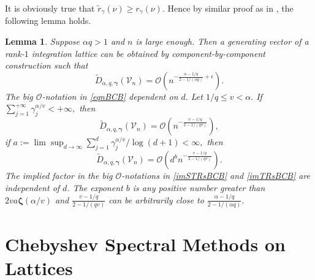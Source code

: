 \documentclass[article]{siamltex}
\newtheorem{Lemma}{Lemma}
\def\bgam{{\boldsymbol \gamma }}
\def\bzeta{{\boldsymbol \zeta }}
\def\calV {\mathcal {V}}
\newcommand{\dsum}{\displaystyle\sum}
\begin{document}
It is obviously true that $\tilde{r}_{\gamma}(\nu)\ge {r}_{\gamma}(\nu)$.  Hence by similar proof as in  \cite[Lemma 1.13]{Zengthesis},  the following lemma holds.

\vskip5mm   \begin{Lemma}\label{CBC} Suppose $\alpha q>1$ and $n$
is large enough. Then a generating vector of a rank-$1$
integration lattice can be obtained  by component-by-component
construction  such that
\begin{equation}\label{eqnBCB}\widetilde{D}_{\alpha, q,\bgam}({\calV}_n)= \mathcal{O}\left(
{n^{-\frac{\alpha-1/q}{2-1/(\alpha q)} +\epsilon}}\right).
\end{equation} The big $\mathcal{O}$-notation in \eqref{eqnBCB} dependent on $d.$
 \noindent Let $1/q\le v <\alpha.$  If $\dsum_{j=1}^{+\infty} \gamma_{j}^{\alpha /v}<+\infty,$ then
\begin{equation}\label{imSTRsBCB}\widetilde{D}_{\alpha,
q,\bgam}({\calV}_n)
=\mathcal{O}\left(n^{-\frac{v-1/q}{2-1/(qv)}}\right),\end{equation}
if
$a:=\lim\sup_{d\rightarrow\infty}\sum\limits_{j=1}^{d}\gamma_j^{{
\alpha/v}}/\log(d+1)<\infty,$ then
\begin{equation}\label{imTRsBCB}
\widetilde{D}_{\alpha, q,\bgam}({\calV}_n)= \mathcal{O}\left(
d^{b}{n^{-\frac{v-1/q}{2-1/(qv)}}}\right).\end{equation} The
implied factor in the big $\mathcal{O}$-notations in
\eqref{imSTRsBCB} and \eqref{imTRsBCB} are independent of $d$. The
exponent $b$ is any positive number greater than $2va\bzeta({
\alpha/v})$ and $\frac{v-1/q}{2-1/(qv)}$ can be arbitrarily close
to $\frac{\alpha-1/q}{2-1/(\alpha q)}.$
\end{Lemma}




\vskip8mm  \section{Chebyshev Spectral Methods on Lattices}
\end{document}
